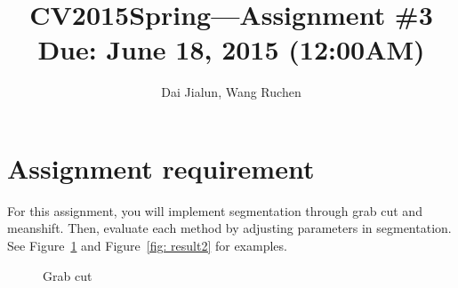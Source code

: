 \documentclass[12pt]{article}
\begin{document}
\title{\vspace{-2em}CV2015Spring---Assignment \#\textbf{3}\\
\normalsize{Due: June 18, 2015 (12:00AM)}}
\author{Dai Jialun, Wang Ruchen}
\maketitle\thispagestyle{fancy}
\maketitle


\section{Assignment requirement}

For this assignment, you will implement segmentation through grab cut and meanshift. Then, evaluate each method by adjusting parameters in segmentation. See Figure~\ref{fig: result1} and Figure~\ref{fig: result2} for examples.
\begin{figure}[!ht]
  \centering 
  \caption{Grab cut}
  \label{fig: result1} %
\end{figure}
\end{document}

